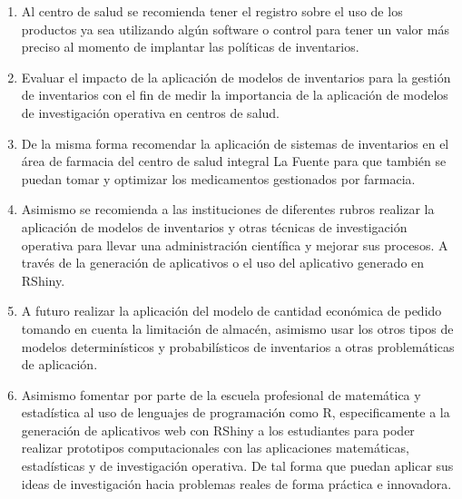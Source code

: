 \begin{recomendaciones}
	
\begin{enumerate}
\item Al centro de salud se recomienda tener el registro sobre el uso de los productos ya sea utilizando algún software o control para tener un valor más preciso al momento de implantar las políticas de inventarios.
\item Evaluar el impacto de la aplicación de modelos de inventarios para la gestión de inventarios con el fin de medir la importancia de la aplicación de modelos de investigación operativa en centros de salud.
\item De la misma forma recomendar la aplicación de sistemas de inventarios en el área de farmacia del centro de salud integral La Fuente para que también se puedan tomar y optimizar los medicamentos gestionados por farmacia.
\item Asimismo se recomienda a las instituciones de diferentes rubros realizar la aplicación de modelos de inventarios y otras técnicas de investigación operativa para llevar una administración científica y mejorar sus procesos. A través de la generación de aplicativos o el uso del aplicativo generado en RShiny.
\item A futuro realizar la aplicación del modelo de cantidad económica de pedido tomando en cuenta la limitación de almacén, asimismo usar los otros tipos de modelos determinísticos y probabilísticos de inventarios a otras problemáticas de aplicación.
\item Asimismo fomentar por parte de la escuela profesional de matemática y estadística al uso de lenguajes de programación como R, especificamente a la generación de aplicativos web con RShiny a los estudiantes para poder realizar prototipos computacionales con las aplicaciones matemáticas, estadísticas y de investigación operativa. De tal forma que puedan aplicar sus ideas de investigación hacia problemas reales de forma práctica e innovadora.
\end{enumerate}
	
\end{recomendaciones}
